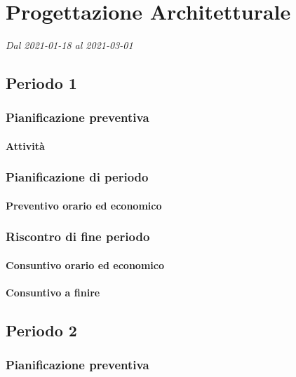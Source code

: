\section{Progettazione Architetturale}
\textit{Dal 2021-01-18 al 2021-03-01}




\subsection{Periodo 1}

\subsubsection{Pianificazione preventiva}

\paragraph{Attività}


\subsubsection{Pianificazione di periodo}



\paragraph{Preventivo orario ed economico}



\subsubsection{Riscontro di fine periodo}


\paragraph{Consuntivo orario ed economico}


\paragraph{Consuntivo a finire}




\subsection{Periodo 2}

\subsubsection{Pianificazione preventiva}

